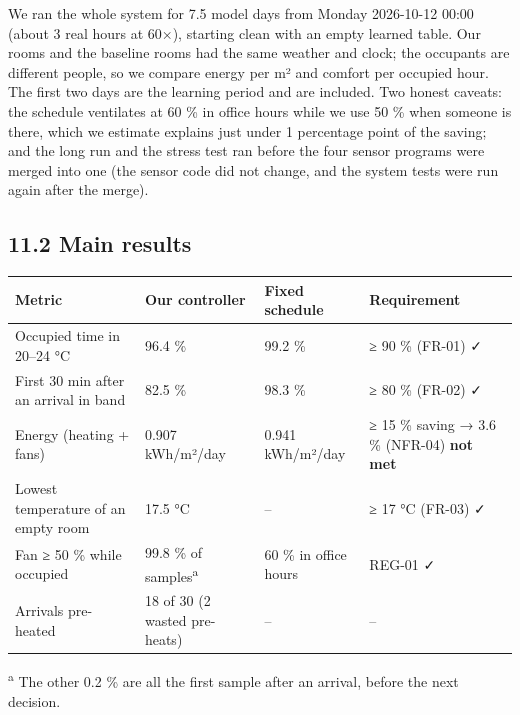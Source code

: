 \documentclass[11pt]{article}
\begin{document}
We ran the whole system for 7.5 model days from Monday 2026-10-12 00:00 (about 3 real hours at
60×), starting clean with an empty learned table. Our rooms and the baseline rooms had the same
weather and clock; the occupants are different people, so we compare energy per m² and comfort
per occupied hour. The first two days are the learning period and are included. Two honest
caveats: the schedule ventilates at 60 \% in office hours while we use 50 \% when someone is there,
which we estimate explains just under 1 percentage point of the saving; and the long run and the
stress test ran before the four sensor programs were merged into one (the sensor code did not
change, and the system tests were run again after the merge).

\newpage
\subsection{11.2 Main results}

\begin{longtable}{@{}L{0.3}L{0.22}L{0.2}L{0.28}@{}}
\toprule
\textbf{Metric} & \textbf{Our controller} & \textbf{Fixed schedule} & \textbf{Requirement} \\
\midrule
\endhead
\bottomrule
\endlastfoot
Occupied time in 20--24 °C & 96.4 \% & 99.2 \% & ≥ 90 \% (FR-01) ✓ \\
First 30 min after an arrival in band & 82.5 \% & 98.3 \% & ≥ 80 \% (FR-02) ✓ \\
Energy (heating + fans) & 0.907 kWh/m²/day & 0.941 kWh/m²/day & ≥ 15 \% saving → 3.6 \% (NFR-04) \textbf{not met} \\
Lowest temperature of an empty room & 17.5 °C & -- & ≥ 17 °C (FR-03) ✓ \\
Fan ≥ 50 \% while occupied & 99.8 \% of samples\textsuperscript{a} & 60 \% in office hours & REG-01 ✓ \\
Arrivals pre-heated & 18 of 30 (2 wasted pre-heats) & -- & -- \\
\end{longtable}
{\footnotesize \textsuperscript{a} The other 0.2 \% are all the first sample after an arrival, before
the next decision.}


\end{document}
